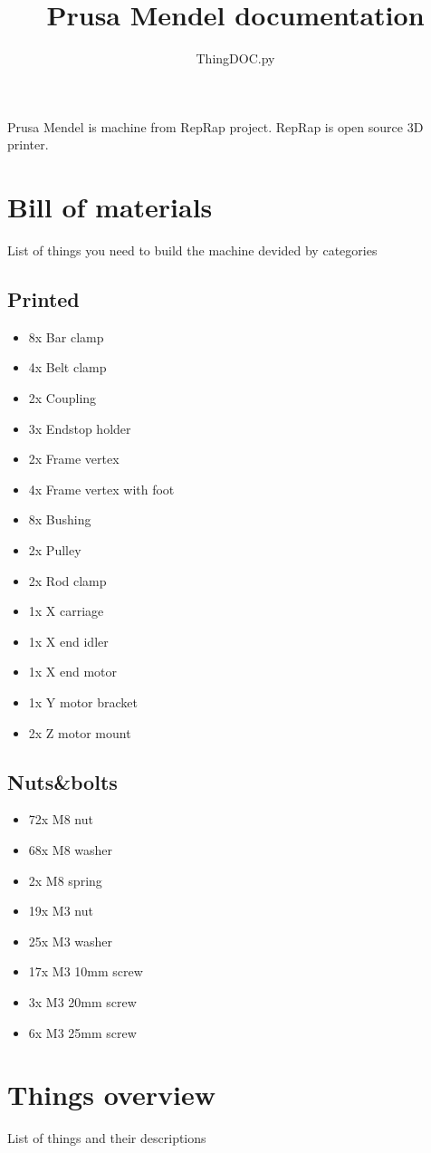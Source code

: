 \documentclass[11pt]{article}
\title{Prusa Mendel documentation}
\author{ThingDOC.py}
\begin{document}
\maketitle
Prusa Mendel is machine from RepRap project. RepRap is open source 3D printer.
\newpage
\tableofcontents
\newpage
\section{Bill of materials}
List of things you need to build the machine devided by categories
\subsection{Printed}
\begin{itemize}
\item 8x Bar clamp
\item 4x Belt clamp
\item 2x Coupling
\item 3x Endstop holder
\item 2x Frame vertex
\item 4x Frame vertex with foot
\item 8x Bushing
\item 2x Pulley
\item 2x Rod clamp
\item 1x X carriage
\item 1x X end idler
\item 1x X end motor
\item 1x Y motor bracket
\item 2x Z motor mount
\end{itemize}
\subsection{Nuts\&bolts}
\begin{itemize}
\item 72x M8 nut
\item 68x M8 washer
\item 2x M8 spring
\item 19x M3 nut
\item 25x M3 washer
\item 17x M3 10mm screw
\item 3x M3 20mm screw
\item 6x M3 25mm screw
\end{itemize}
\newpage
\section{Things overview}
List of things and their descriptions
\end{document}
